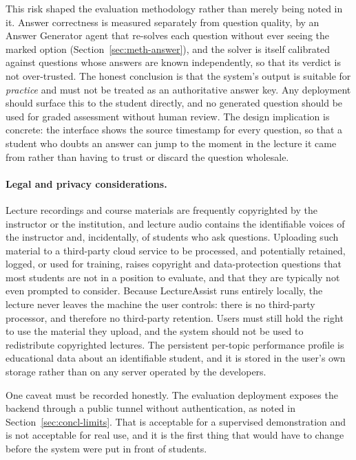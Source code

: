 This risk shaped the evaluation methodology rather than merely being noted in it.
Answer correctness is measured separately from question quality, by an Answer
Generator agent that re-solves each question without ever seeing the marked option
(Section~\ref{sec:meth-answer}), and the solver is itself calibrated against
questions whose answers are known independently, so that its verdict is not
over-trusted. The honest conclusion is that the system's output is suitable for
\emph{practice} and must not be treated as an authoritative answer key. Any
deployment should surface this to the student directly, and no generated question
should be used for graded assessment without human review. The design implication is
concrete: the interface shows the source timestamp for every question, so that a
student who doubts an answer can jump to the moment in the lecture it came from
rather than having to trust or discard the question wholesale.

\paragraph{Legal and privacy considerations.} Lecture recordings and course materials
are frequently copyrighted by the instructor or the institution, and lecture audio
contains the identifiable voices of the instructor and, incidentally, of students who
ask questions. Uploading such material to a third-party cloud service to be processed, and potentially retained, logged, or used for training, raises copyright and
data-protection questions that most students are not in a position to evaluate, and
that they are typically not even prompted to consider. Because LectureAssist runs
entirely locally, the lecture never leaves the machine the user controls: there is no
third-party processor, and therefore no third-party retention. Users must still hold
the right to use the material they upload, and the system should not be used to
redistribute copyrighted lectures. The persistent per-topic performance profile is
educational data about an identifiable student, and it is stored in the user's own
storage rather than on any server operated by the developers.

One caveat must be recorded honestly. The evaluation deployment exposes the backend
through a public tunnel without authentication, as noted in
Section~\ref{sec:concl-limits}. That is acceptable for a supervised demonstration and
is not acceptable for real use, and it is the first thing that would have to change
before the system were put in front of students.

